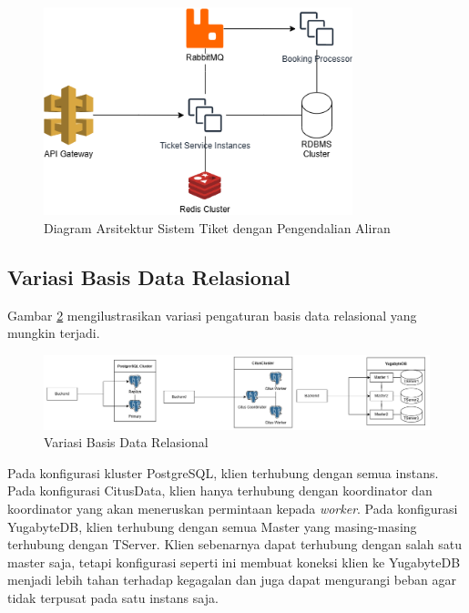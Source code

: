 \begin{figure}[H]
    \centering
    \includegraphics[width=0.8\textwidth]{resources/chapter-3/ticket-fc.png}
    \caption{Diagram Arsitektur Sistem Tiket dengan Pengendalian Aliran}
    \label{fig:ticket-fc}
\end{figure}

\subsection{Variasi Basis Data Relasional}

Gambar \ref{fig:rdbms-variation} mengilustrasikan variasi pengaturan basis data relasional yang mungkin terjadi.

\begin{figure}[H]
    \centering
    \includegraphics[width=1\textwidth]{resources/chapter-3/rdbms.png}
    \caption{Variasi Basis Data Relasional}
    \label{fig:rdbms-variation}
\end{figure}

Pada konfigurasi kluster PostgreSQL, klien terhubung dengan semua instans. Pada konfigurasi CitusData, klien hanya terhubung dengan koordinator dan koordinator yang akan meneruskan permintaan kepada \textit{worker}. Pada konfigurasi YugabyteDB, klien terhubung dengan semua Master yang masing-masing terhubung dengan TServer. Klien sebenarnya dapat terhubung dengan salah satu master saja, tetapi konfigurasi seperti ini membuat koneksi klien ke YugabyteDB menjadi lebih tahan terhadap kegagalan dan juga dapat mengurangi beban agar tidak terpusat pada satu instans saja.

